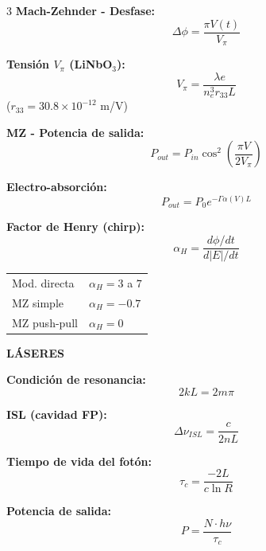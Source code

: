 \documentclass[10pt,a4paper,landscape]{article}
\newcommand{\secbox}[1]{\colorbox{blue!20}{\textbf{#1}}}
\begin{document}
\begin{multicols}{3}
\textbf{Mach-Zehnder - Desfase:}
\begin{equation*}
\boxed{\Delta\phi = \frac{\pi V(t)}{V_\pi}}
\end{equation*}

\textbf{Tensión $V_\pi$ (LiNbO$_3$):}
\begin{equation*}
\boxed{V_\pi = \frac{\lambda e}{n_e^3 r_{33} L}}
\end{equation*}
($r_{33} = 30.8 \times 10^{-12}$ m/V)

\textbf{MZ - Potencia de salida:}
\begin{equation*}
\boxed{P_{out} = P_{in} \cos^2\left(\frac{\pi V}{2V_\pi}\right)}
\end{equation*}

\textbf{Electro-absorción:}
\begin{equation*}
\boxed{P_{out} = P_0 e^{-\Gamma \alpha(V) L}}
\end{equation*}

\textbf{Factor de Henry (chirp):}
\begin{equation*}
\boxed{\alpha_H = \frac{d\phi/dt}{d|E|/dt}}
\end{equation*}

\begin{tabular}{ll}
Mod. directa & $\alpha_H = 3$ a $7$ \\
MZ simple & $\alpha_H = -0.7$ \\
MZ push-pull & $\alpha_H = 0$ \\
\end{tabular}

\secbox{LÁSERES}

\textbf{Condición de resonancia:}
\begin{equation*}
\boxed{2kL = 2m\pi}
\end{equation*}

\textbf{ISL (cavidad FP):}
\begin{equation*}
\boxed{\Delta\nu_{ISL} = \frac{c}{2nL}}
\end{equation*}

\textbf{Tiempo de vida del fotón:}
\begin{equation*}
\boxed{\tau_c = \frac{-2L}{c \ln R}}
\end{equation*}

\textbf{Potencia de salida:}
\begin{equation*}
\boxed{P = \frac{N \cdot h\nu}{\tau_c}}
\end{equation*}


\end{multicols}
\end{document}

